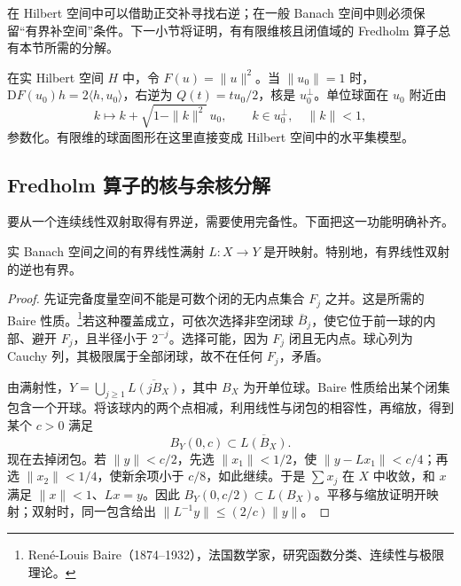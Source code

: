 在 Hilbert 空间中可以借助正交补寻找右逆；在一般 Banach 空间中则必须保留“有界补空间”条件。下一小节将证明，有有限维核且闭值域的 Fredholm 算子总有本节所需的分解。

\begin{example}\label{g3:exm:banach-sphere-regular-level}
	在实 Hilbert 空间 \(H\) 中，令 \(F(u)=\|u\|^2\)。当 \(\|u_0\|=1\) 时，\(\mathrm DF(u_0)h=2\langle h,u_0\rangle\)，右逆为 \(Q(t)=tu_0/2\)，核是 \(u_0^\perp\)。单位球面在 \(u_0\) 附近由
	\[
		k\longmapsto k+\sqrt{1-\|k\|^2}\,u_0,
		\qquad k\in u_0^\perp,\quad\|k\|<1,
	\]
	参数化。有限维的球面图形在这里直接变成 Hilbert 空间中的水平集模型。
\end{example}

\subsection{Fredholm 算子的核与余核分解}
\label{g3:subsec:1305:04}
要从一个连续线性双射取得有界逆，需要使用完备性。下面把这一功能明确补齐。

\begin{lemma}[开映射定理]\label{g3:lem:banach-open-mapping}
	实 Banach 空间之间的有界线性满射 \(L:X\to Y\) 是开映射。特别地，有界线性双射的逆也有界。
\end{lemma}
\begin{proof}
	先证完备度量空间不能是可数个闭的无内点集合 \(F_j\) 之并。这是所需的 Baire 性质。\footnote{René-Louis Baire（1874--1932），法国数学家，研究函数分类、连续性与极限理论。}若这种覆盖成立，可依次选择非空闭球 \(\overline B_j\)，使它位于前一球的内部、避开 \(F_j\)，且半径小于 \(2^{-j}\)。选择可能，因为 \(F_j\) 闭且无内点。球心列为 Cauchy 列，其极限属于全部闭球，故不在任何 \(F_j\)，矛盾。

	由满射性，\(Y=\bigcup_{j\ge1}\overline{L(jB_X)}\)，其中 \(B_X\) 为开单位球。Baire 性质给出某个闭集包含一个开球。将该球内的两个点相减，利用线性与闭包的相容性，再缩放，得到某个 \(c>0\) 满足
	\[
		B_Y(0,c)\subset\overline{L(B_X)}.
	\]
	现在去掉闭包。若 \(\|y\|<c/2\)，先选 \(\|x_1\|<1/2\)，使 \(\|y-Lx_1\|<c/4\)；再选 \(\|x_2\|<1/4\)，使新余项小于 \(c/8\)，如此继续。于是 \(\sum x_j\) 在 \(X\) 中收敛，和 \(x\) 满足 \(\|x\|<1\)、\(Lx=y\)。因此 \(B_Y(0,c/2)\subset L(B_X)\)。平移与缩放证明开映射；双射时，同一包含给出 \(\|L^{-1}y\|\le(2/c)\|y\|\)。
\end{proof}

